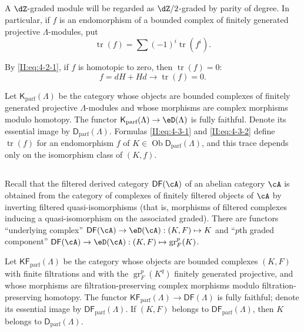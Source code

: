 \documentclass[12pt,oneside,english]{smfbook}
\DeclareMathOperator{\gr}{gr}
\DeclareMathOperator{\ob}{Ob}
\DeclareMathOperator{\tr}{tr}
\begin{document}
\subsection{}\label{II:4-3}

A $\dZ$-graded module will be regarded as $\dZ/2$-graded by parity of degree. In particular, if $f$ is an endomorphism of a bounded complex of finitely generated projective $\Lambda$-modules, put
\begin{equation*}\tag{4.3.1}\label{II:eq:4-3-1}
  \tr(f) = \sum (-1)^i \tr(f^i) \text{.}
\end{equation*}

By \eqref{II:eq:4-2-1}, if $f$ is homotopic to zero, then $\tr(f)=0$:
\begin{equation*}\tag{4.3.2}\label{II:eq:4-3-2}
  f = dH + Hd \rightarrow \tr(f) = 0 \text{.}
\end{equation*}

Let $\mathsf{K}_\text{parf}(\Lambda)$ be the category whose objects are bounded complexes of finitely generated projective $\Lambda$-modules and whose morphisms are complex morphisms modulo homotopy. The functor $\mathsf{K}_\text{parf}(\Lambda)\to\eD(\Lambda)$ is fully faithful. Denote its essential image by $\mathsf{D}_\text{parf}(\Lambda)$. Formulas \eqref{II:eq:4-3-1} and \eqref{II:eq:4-3-2} define $\tr(f)$ for an endomorphism $f$ of $K\in\ob\mathsf{D}_\text{parf}(\Lambda)$, and this trace depends only on the isomorphism class of $(K,f)$.

\subsection{}\label{II:4-4}

Recall that the filtered derived category $\mathsf{DF}(\cA)$ of an abelian category $\cA$ is obtained from the category of complexes of finitely filtered objects of $\cA$ by inverting filtered quasi-isomorphisms (that is, morphisms of filtered complexes inducing a quasi-isomorphism on the associated graded). There are functors ``underlying complex'' $\mathsf{DF}(\cA)\to\eD(\cA):(K,F)\mapsto K$ and ``$p$th graded component'' $\mathsf{DF}(\cA)\to\eD(\cA):(K,F)\mapsto\gr_F^p(K)$.

Let $\mathsf{KF}_\text{parf}(\Lambda)$ be the category whose objects are bounded complexes $(K,F)$ with finite filtrations and with the $\gr_F^p(K^q)$ finitely generated projective, and whose morphisms are filtration-preserving complex morphisms modulo filtration-preserving homotopy. The functor $\mathsf{KF}_\text{parf}(\Lambda)\to\mathsf{DF}(\Lambda)$ is fully faithful; denote its essential image by $\mathsf{DF}_\text{parf}(\Lambda)$. If $(K,F)$ belongs to $\mathsf{DF}_\text{parf}(\Lambda)$, then $K$ belongs to $\mathsf{D}_\text{parf}(\Lambda)$.
\end{document}
